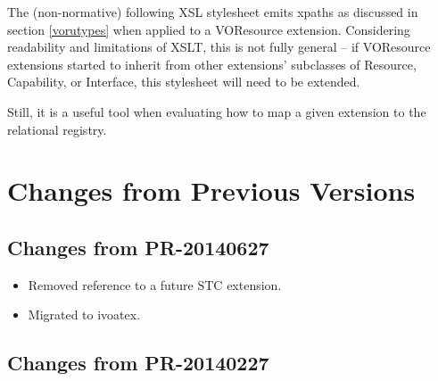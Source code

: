 \documentclass[11pt,a4paper]{ivoa}
\begin{document}
\label{appMkut}

The (non-normative) following XSL stylesheet emits xpaths as
discussed in section \ref{vorutypes} when applied to a
VOResource extension.  Considering readability and limitations of XSLT, this is
not fully general -- if VOResource extensions started to inherit from other
extensions' subclasses of Resource, Capability, or Interface, this stylesheet
will need to be extended.

Still, it is a useful tool when evaluating how to map a given extension
to the relational registry.







\section{Changes from Previous Versions}

\label{changes}



\subsection{Changes from PR-20140627}

\begin{itemize}
\item Removed reference to a future STC extension.
\item Migrated to ivoatex.
\end{itemize}

\subsection{Changes from
PR-20140227}

\label{changes-20140227}
\end{document}
